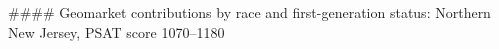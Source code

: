 #### Geomarket contributions by race and first-generation status: Northern New Jersey, PSAT score 1070–1180
